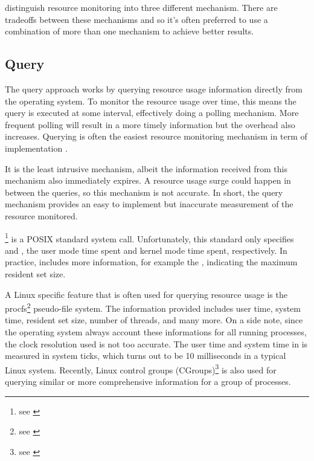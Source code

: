 \citet{juvePracticalResourceMonitoring2015} distinguish resource monitoring into three different mechanism.
There are tradeoffs between these mechanisms and so it's often preferred to use a combination of more than one mechanism to achieve better results.

\subsection{Query}

The query approach works by querying resource usage information directly from the operating system.
To monitor the resource usage over time, this means the query is executed at some interval, effectively doing a polling mechanism.
More frequent polling will result in a more timely information but the overhead also increases.
Querying is often the easiest resource monitoring mechanism in term of implementation \citep{juvePracticalResourceMonitoring2015}.

It is the least intrusive mechanism, albeit the information received from this mechanism also immediately expires.
A resource usage surge could happen in between the queries, so this mechanism is not accurate.
In short, the query mechanism provides an easy to implement but inaccurate measurement of the resource monitored.

\footnote{see \href{https://linux.die.net/man/2/getrusage}{}} is a POSIX standard system call.
Unfortunately, this standard only specifies  and , the user mode time spent and kernel mode time spent, respectively.
In practice,  includes more information, for example the , indicating the maximum resident set size.

A Linux specific feature that is often used for querying resource usage is the procfs\footnote{see \href{https://linux.die.net/man/5/proc}{}} pseudo-file system.
The information provided includes user time, system time, resident set size, number of threads, and many more.
On a side note, since the operating system always account these informations for all running processes, the clock resolution used is not too accurate.
The user time and system time in  is measured in system ticks, which turns out to be 10 milliseconds in a typical Linux system.
Recently, Linux control groups (CGroups)\footnote{see \href{http://man7.org/linux/man-pages/man7/cgroups.7.html}{}} is also used for querying similar or more comprehensive information for a group of processes.

